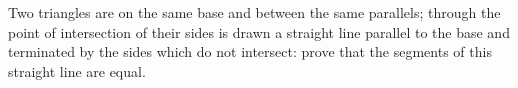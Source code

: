 Two triangles are on the same base and between 
the same parallels; through the point of intersection 
of their sides is drawn a straight line parallel to 
the base and terminated by the sides which do not
intersect: prove that the segments of this straight line
are equal.
